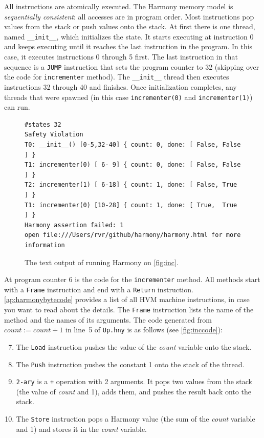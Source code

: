 \documentclass{report}
\newenvironment{code}{
\tcolorbox
}{
\endtcolorbox
}
\begin{document}
%
All instructions are atomically executed.
The Harmony memory model is \emph{sequentially consistent}: all
accesses are in program order.
Most instructions pop values from the stack or push values onto the stack.
At first there is one thread, named \texttt{\_\_init\_\_},
which initializes the state.
It starts executing at instruction 0 and keeps executing until
it reaches the last instruction in the program.
In this case, it executes instructions 0 through 5 first.
The last instruction in that sequence is a \texttt{JUMP}
instruction that sets the program counter to 32
(skipping over the code for \texttt{incrementer} method).
The \texttt{\_\_init\_\_} thread then executes instructions
32 through 40 and finishes.
Once initialization completes, any threads that were spawned
(in this case \texttt{incrementer(0)} and \texttt{incrementer(1)})
can run.

\begin{figure}
\begin{code}
\begin{verbatim}
#states 32
Safety Violation
T0: __init__() [0-5,32-40] { count: 0, done: [ False, False ] }
T1: incrementer(0) [ 6- 9] { count: 0, done: [ False, False ] }
T2: incrementer(1) [ 6-18] { count: 1, done: [ False, True  ] }
T1: incrementer(0) [10-28] { count: 1, done: [ True,  True  ] }
Harmony assertion failed: 1
open file:///Users/rvr/github/harmony/harmony.html for more information
\end{verbatim}
\end{code}
\caption{The text output of running Harmony on \autoref{fig:inc}.}
\label{fig:incoutput}
\end{figure}

At program counter 6 is the code for the \texttt{incrementer} method.
All methods start with a \texttt{Frame} instruction and end with a
\texttt{Return} instruction.
\autoref{ap:harmonybytecode} provides a list of all HVM machine instructions,
in case you want to read about the details.
The \texttt{Frame} instruction lists the name of the method and the
names of its arguments.
The code generated from $\mathit{count} := \mathit{count} + 1$ in line~5 of
\texttt{Up.hny} is as follows (see \autoref{fig:inccode}):

\begin{enumerate} \setcounter{enumi}{6}
\item The \texttt{Load} instruction pushes the value of the
\textit{count} variable onto the stack.
\item The \texttt{Push} instruction pushes the constant 1
onto the stack of the thread.
\item \texttt{2-ary} is a \texttt{+} operation with 2 arguments.
It pops two values from the stack (the value of \textit{count} and 1),
adds them, and pushes the result back onto the stack.
\item The \texttt{Store} instruction pops
a Harmony value (the sum of the \textit{count} variable and 1) and
stores it in the \textit{count} variable.
\end{enumerate}
\end{document}
